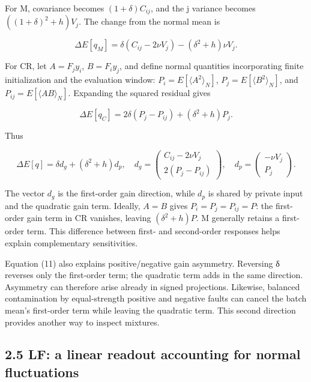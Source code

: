 \documentclass[10pt,a4paper]{article}
\begin{document}
For M, covariance becomes \((1+\delta)C_{ij}\), and the j variance becomes \(((1+\delta)^2+h)V_j\). The change from the normal mean is

\begin{equation}
\Delta E[q_M]
=\delta(C_{ij}-2\nu V_j)-(\delta^2+h)\nu V_j.
\tag{9}
\end{equation}

For CR, let \(A=F_jy_i\), \(B=F_iy_j\), and define normal quantities incorporating finite initialization and the evaluation window: \(P_i=E[\langle A^2\rangle_N]\), \(P_j=E[\langle B^2\rangle_N]\), and \(P_{ij}=E[\langle AB\rangle_N]\). Expanding the squared residual gives

\begin{equation}
\Delta E[q_C]
=2\delta(P_j-P_{ij})+(\delta^2+h)P_j.
\tag{10}
\end{equation}

Thus

\begin{equation}
\Delta E[q]=\delta d_g+(\delta^2+h)d_p,\quad
d_g=\begin{pmatrix}C_{ij}-2\nu V_j\\2(P_j-P_{ij})\end{pmatrix},\quad
d_p=\begin{pmatrix}-\nu V_j\\P_j\end{pmatrix}.
\tag{11}
\end{equation}

The vector \(d_g\) is the first-order gain direction, while \(d_p\) is shared by private input and the quadratic gain term. Ideally, \(A=B\) gives \(P_i=P_j=P_{ij}=P\): the first-order gain term in CR vanishes, leaving \((\delta^2+h)P\). M generally retains a first-order term. This difference between first- and second-order responses helps explain complementary sensitivities.

Equation (11) also explains positive/negative gain asymmetry. Reversing δ reverses only the first-order term; the quadratic term adds in the same direction. Asymmetry can therefore arise already in signed projections. Likewise, balanced contamination by equal-strength positive and negative faults can cancel the batch mean's first-order term while leaving the quadratic term. This second direction provides another way to inspect mixtures.

\subsection{2.5 LF: a linear readout accounting for normal fluctuations}
\end{document}

